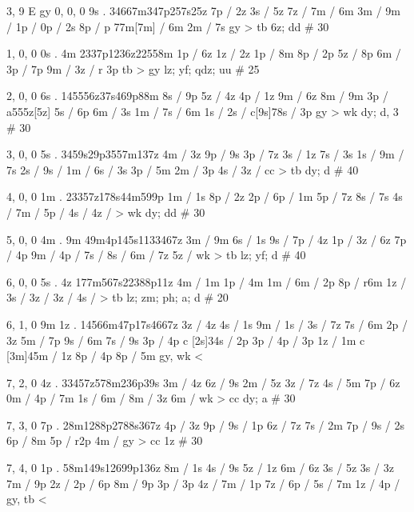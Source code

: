 3, 9
E
gy
0, 0, 0
9s . 
34667m347p257s25z
7p / 2z
3s / 5z
7z / 
7m / 6m
3m / 
9m / 
1p / 
0p / 2s
8p / 
p 77m[7m] / 6m
2m / 7s
gy > tb 
6z; dd # 30 

1, 0, 0
0s . 4m 
2337p1236z22558m
1p / 6z
1z / 2z 
1p / 8m
8p / 2p 
5z / 8p
6m /
3p / 7p 
9m / 
3z / r 3p 
tb > gy 
lz; yf; qdz; uu # 25

2, 0, 0 
6s .
145556z37s469p88m
8s / 9p
5z / 4z
4p / 1z 
9m / 6z
8m / 9m
3p / a555z[5z]
5s / 6p
6m / 3s 
1m / 
7s / 6m
1s / 
2s / 
c[9s]78s / 3p
gy > wk
dy; d, 3 # 30 

3, 0, 0
5s .
3459s29p3557m137z
4m / 3z 
9p / 9s
3p / 7z
3s / 1z 
7s / 3s 
1s / 
9m / 7s 
2s /
9s / 
1m / 
6s / 3s 
3p / 5m 
2m / 3p 
4s / 
3z / 
cc > tb 
dy; d # 40 

4, 0, 0 
1m . 
23357z178s44m599p
1m / 1s 
8p / 2z 
2p / 
6p / 1m 
5p / 7z 
8s / 7s 
4s / 
7m / 
5p / 
4s / 
4z / 
> wk 
dy; dd # 30 

5, 0, 0 
4m . 9m 
49m4p145s1133467z
3m / 9m
6s / 1s 
9s / 
7p / 4z 
1p / 
3z / 6z 
7p / 4p 
9m / 
4p / 
7s / 
8s / 
6m / 7z 
5z / 
wk > tb 
lz; yf; d # 40 

6, 0, 0
5s . 4z 
177m567s22388p11z
4m / 1m 
1p / 4m 
1m / 
6m / 2p
8p / r6m 
1z / 
3s / 
3z / 
3z / 
4s / 
> tb 
lz; zm; ph; a; d # 20 

6, 1, 0 
9m 1z . 
14566m47p17s4667z
3z / 4z 
4s / 1s 
9m / 
1s / 
3s / 7z
7s / 6m 
2p / 3z
5m / 7p 
9s / 6m
7s / 9s 
3p / 4p 
c [2s]34s / 2p 
3p / 
4p / 3p 
1z / 1m 
c [3m]45m / 1z 
8p / 4p 
8p / 5m  
gy, wk < 

7, 2, 0
4z . 
33457z578m236p39s
3m / 4z 
6z / 9s 
2m / 5z 
3z / 7z 
4s / 5m 
7p / 6z 
0m / 
4p / 7m 
1s / 
6m / 
8m / 3z 
6m / 
wk > cc 
dy; a # 30 

7, 3, 0 
7p . 
28m1288p2788s367z
4p / 3z
9p / 
9s / 1p 
6z / 7z 
7s / 2m 
7p / 
9s / 2s 
6p / 8m 
5p / r2p 
4m / 
gy > cc 
1z # 30 

7, 4, 0 
1p . 
58m149s12699p136z
8m / 1s 
4s / 9s 
5z / 1z 
6m / 6z 
3s / 5z 
3s / 3z 
7m / 9p 
2z / 
2p / 6p 
8m / 9p
3p / 3p 
4z / 
7m / 1p 
7z / 
6p / 
5s / 7m
1z /
4p / 
gy, tb <